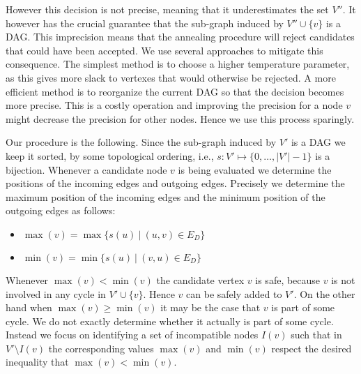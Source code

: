 \documentclass[a4paper]{article}
\begin{document}
However this decision is not precise, meaning that it underestimates the
set $V''$. It however has the crucial guarantee that the sub-graph induced
by $V'' \cup \{v\}$ is a DAG. This imprecision means that the annealing
procedure will reject candidates that could have been accepted. We use
several approaches to mitigate this consequence. The simplest method is to
choose a higher temperature parameter, as this gives more slack to vertexes
that would otherwise be rejected. A more efficient method is to reorganize
the current DAG so that the decision becomes more precise. This is a costly
operation and improving the precision for a node $v$ might decrease the
precision for other nodes. Hence we use this process sparingly.

Our procedure is the following. Since the sub-graph induced by $V'$ is a
DAG we keep it sorted, by some topological ordering, i.e.,
$s:V' \mapsto \{0, \ldots, |V'|-1\}$ is a bijection. Whenever a candidate
node $v$ is being evaluated we determine the positions of the incoming
edges and outgoing edges. Precisely we determine the maximum position of
the incoming edges and the minimum position of the outgoing edges as
follows:
%
 \begin{itemize}
 \item $\max(v) = \max \{s(u)\ |\ (u, v) \in E_D\}$
 \item $\min(v) = \min \{s(u)\ |\ (v, u) \in E_D\}$
 \end{itemize}
 Whenever $\max(v) < \min(v)$ the candidate vertex $v$ is safe, because $v$
 is not involved in any cycle in $V' \cup \{v\}$. Hence $v$ can be safely
 added to $V'$. On the other hand when $\max(v) \geq \min(v)$ it may be the
 case that $v$ is part of some cycle. We do not exactly determine whether
 it actually is part of some cycle. Instead we focus on identifying a set
 of incompatible nodes $I(v)$ such that in $V' \setminus I(v)$ the
 corresponding values $\max(v)$ and $\min(v)$ respect the desired
 inequality that $\max(v) < \min(v)$.
\end{document}

